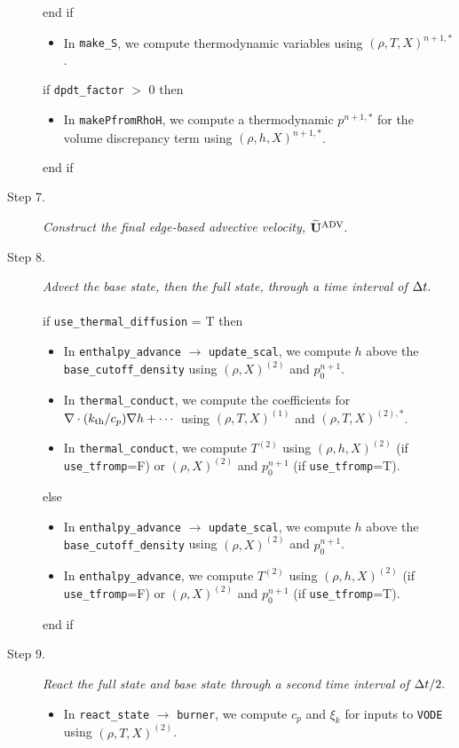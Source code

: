 \begin{description}
\begin{itemize}
\end{itemize}
end if
\begin{itemize}
\item In {\tt make\_S}, we compute thermodynamic variables using $(\rho,T,X)^{n+1,*}$.
\end{itemize}
if {\tt dpdt\_factor} $>$ 0 then
\begin{itemize}
\item In {\tt makePfromRhoH}, we compute a thermodynamic $p^{n+1,*}$ for the volume 
discrepancy term using $(\rho,h,X)^{n+1,*}$.
\end{itemize}
end if
\item[Step 7.] {\em Construct the final edge-based advective velocity, $\widetilde{\mathbf{U}}^{\mathrm{ADV}}.$}
\item[Step 8.] {\em Advect the base state, then the full state, through a time interval 
of $\Delta t.$}\\ \\
if {\tt use\_thermal\_diffusion} = T then
\begin{itemize}
\item In {\tt enthalpy\_advance} $\rightarrow$ {\tt update\_scal}, we compute $h$ above
the {\tt base\_cutoff\_density} using $(\rho,X)^{(2)}$ and $p_0^{n+1}$.
\item In {\tt thermal\_conduct}, we compute the coefficients for 
$\nabla\cdot(k_{\rm th}/c_p)\nabla h + \cdots$ using $(\rho,T,X)^{(1)}$ and $(\rho,T,X)^{(2),*}$.
\item In {\tt thermal\_conduct}, we compute $T^{(2)}$ using $(\rho,h,X)^{(2)}$
(if {\tt use\_tfromp}=F) or $(\rho,X)^{(2)}$ and $p_0^{n+1}$ (if {\tt use\_tfromp}=T).
\end{itemize}
else
\begin{itemize}
\item In {\tt enthalpy\_advance} $\rightarrow$ {\tt update\_scal}, we compute $h$ above
the {\tt base\_cutoff\_density} using $(\rho,X)^{(2)}$ and $p_0^{n+1}$.
\item In {\tt enthalpy\_advance}, we compute $T^{(2)}$ using $(\rho,h,X)^{(2)}$
(if {\tt use\_tfromp}=F) or $(\rho,X)^{(2)}$ and $p_0^{n+1}$ (if {\tt use\_tfromp}=T).
\end{itemize}
end if
\item[Step 9.] {\em React the full state and base state through a second time interval 
of $\Delta t/2.$}
\begin{itemize}
\item In {\tt react\_state} $\rightarrow$ {\tt burner}, we compute $c_p$ and $\xi_k$ 
for inputs to {\tt VODE} using $(\rho,T,X)^{(2)}$.

\end{itemize}
\end{description}
